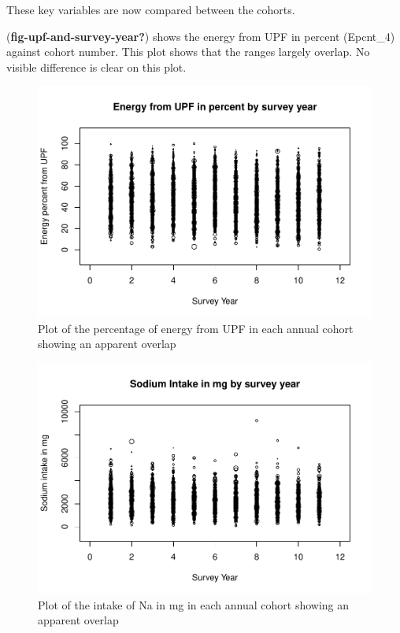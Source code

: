 \documentclass[
]{article}
\begin{document}
These key variables are now compared between the cohorts.

(\textbf{fig-upf-and-survey-year?}) shows the energy from UPF in percent
(Epcnt\_4) against cohort number. This plot shows that the ranges
largely overlap. No visible difference is clear on this plot.

\begin{figure}
\centering
\includegraphics{methodandresults_files/figure-latex/fig-upf-and-survey-year-1.pdf}
\caption{Plot of the percentage of energy from UPF in each annual cohort
showing an apparent overlap}
\end{figure}

\begin{figure}
\centering
\includegraphics{methodandresults_files/figure-latex/fig-Na-and-survey-year-1.pdf}
\caption{Plot of the intake of Na in mg in each annual cohort showing an
apparent overlap}
\end{figure}
\end{document}

